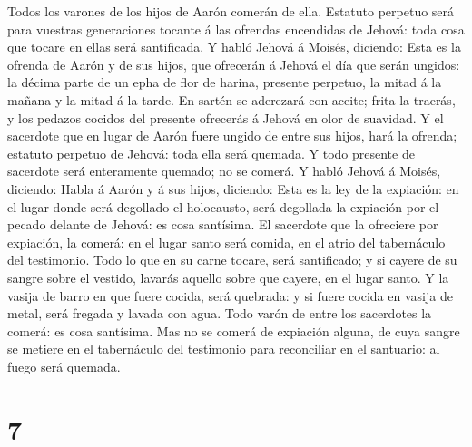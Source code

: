  Todos los varones de los hijos de Aarón comerán de ella.
Estatuto perpetuo será para vuestras generaciones tocante á las ofrendas
encendidas de Jehová: toda cosa que tocare en ellas será santificada.
 Y habló Jehová á Moisés, diciendo:  Esta
es la ofrenda de Aarón y de sus hijos, que ofrecerán á Jehová el día que
serán ungidos: la décima parte de un epha de flor de harina, presente
perpetuo, la mitad á la mañana y la mitad á la tarde.  En
sartén se aderezará con aceite; frita la traerás, y los pedazos cocidos
del presente ofrecerás á Jehová en olor de suavidad.  Y
el sacerdote que en lugar de Aarón fuere ungido de entre sus hijos, hará
la ofrenda; estatuto perpetuo de Jehová: toda ella será quemada.
 Y todo presente de sacerdote será enteramente quemado;
no se comerá.  Y habló Jehová á Moisés, diciendo:
 Habla á Aarón y á sus hijos, diciendo: Esta es la ley de
la expiación: en el lugar donde será degollado el holocausto, será
degollada la expiación por el pecado delante de Jehová: es cosa
santísima.  El sacerdote que la ofreciere por expiación,
la comerá: en el lugar santo será comida, en el atrio del tabernáculo
del testimonio.  Todo lo que en su carne tocare, será
santificado; y si cayere de su sangre sobre el vestido, lavarás aquello
sobre que cayere, en el lugar santo.  Y la vasija de
barro en que fuere cocida, será quebrada: y si fuere cocida en vasija de
metal, será fregada y lavada con agua.  Todo varón de
entre los sacerdotes la comerá: es cosa santísima.  Mas
no se comerá de expiación alguna, de cuya sangre se metiere en el
tabernáculo del testimonio para reconciliar en el santuario: al fuego
será quemada.

\hypertarget{section-6}{%
\section{7}\label{section-6}}

